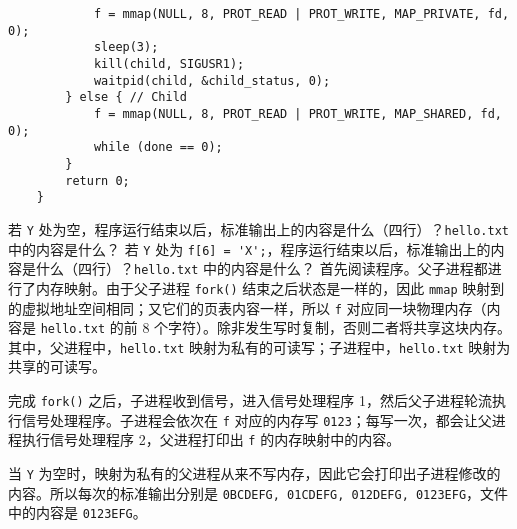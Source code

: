 \begin{problems}
\begin{verbatim}
            f = mmap(NULL, 8, PROT_READ | PROT_WRITE, MAP_PRIVATE, fd, 0);
            sleep(3);
            kill(child, SIGUSR1);
            waitpid(child, &child_status, 0);
        } else { // Child
            f = mmap(NULL, 8, PROT_READ | PROT_WRITE, MAP_SHARED, fd, 0);
            while (done == 0);
        }
        return 0;
    }
        \end{verbatim}
            \qn 若 \verb|Y| 处为空，程序运行结束以后，标准输出上的内容是什么（四行）？\verb|hello.txt| 中的内容是什么？
            \qn 若 \verb|Y| 处为 \verb|f[6] = 'X';|，程序运行结束以后，标准输出上的内容是什么（四行）？\verb|hello.txt| 中的内容是什么？
        \sol 首先阅读程序。父子进程都进行了内存映射。由于父子进程 \verb|fork()| 结束之后状态是一样的，因此 \verb|mmap| 映射到的虚拟地址空间相同；又它们的页表内容一样，所以 \verb|f| 对应同一块物理内存（内容是 \verb|hello.txt| 的前 8 个字符）。除非发生写时复制，否则二者将共享这块内存。其中，父进程中，\verb|hello.txt| 映射为私有的可读写；子进程中，\verb|hello.txt| 映射为共享的可读写。
        
        完成 \verb|fork()| 之后，子进程收到信号，进入信号处理程序 1，然后父子进程轮流执行信号处理程序。子进程会依次在 \verb|f| 对应的内存写 \verb|0123|；每写一次，都会让父进程执行信号处理程序 2，父进程打印出 \verb|f| 的内存映射中的内容。

        当 \verb|Y| 为空时，映射为私有的父进程从来不写内存，因此它会打印出子进程修改的内容。所以每次的标准输出分别是 \verb|0BCDEFG, 01CDEFG, 012DEFG, 0123EFG|，文件中的内容是 \verb|0123EFG|。
        

\end{problems}
